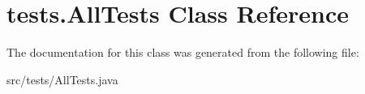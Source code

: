 \hypertarget{classtests_1_1_all_tests}{\section{tests.\-All\-Tests Class Reference}
\label{classtests_1_1_all_tests}
}


The documentation for this class was generated from the following file\-:\begin{DoxyCompactItemize}
\item 
src/tests/All\-Tests.\-java\end{DoxyCompactItemize}
